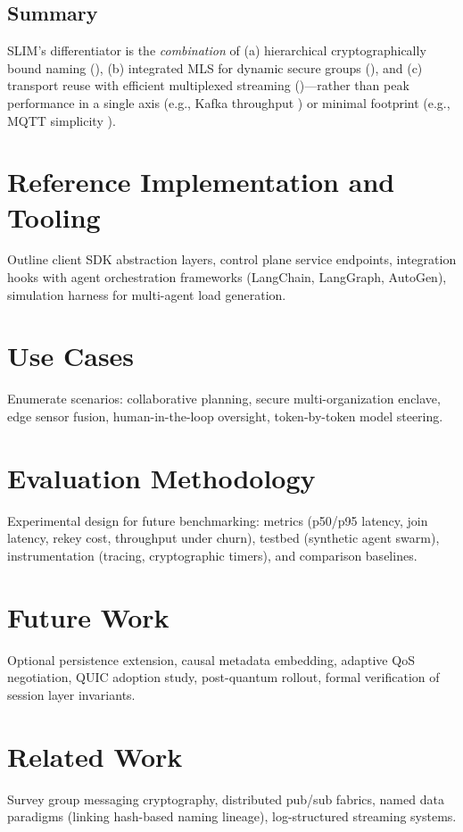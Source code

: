 \documentclass{article}
\theoremstyle{definition}
\theoremstyle{remark}
\begin{document}
\subsection{Summary}
SLIM's differentiator is the \emph{combination} of (a) hierarchical cryptographically bound naming (\citep{rfc6920,didcore}), (b) integrated MLS for dynamic secure groups (\citep{rfc9420,rfc9750}), and (c) transport reuse with efficient multiplexed streaming (\citep{grpc,http2})—rather than peak performance in a single axis (e.g., Kafka throughput \citep{kafka}) or minimal footprint (e.g., MQTT simplicity \citep{mqtt311}).

\section{Reference Implementation and Tooling}\label{sec:implementation}
Outline client SDK abstraction layers, control plane service endpoints, integration hooks with agent orchestration frameworks (LangChain, LangGraph, AutoGen), simulation harness for multi-agent load generation.

\section{Use Cases}\label{sec:usecases}
Enumerate scenarios: collaborative planning, secure multi-organization enclave, edge sensor fusion, human-in-the-loop oversight, token-by-token model steering.

\section{Evaluation Methodology}\label{sec:evaluation}
Experimental design for future benchmarking: metrics (p50/p95 latency, join latency, rekey cost, throughput under churn), testbed (synthetic agent swarm), instrumentation (tracing, cryptographic timers), and comparison baselines.

\section{Future Work}\label{sec:future}
Optional persistence extension, causal metadata embedding, adaptive QoS negotiation, QUIC adoption study, post-quantum rollout, formal verification of session layer invariants.

\section{Related Work}\label{sec:related}
Survey group messaging cryptography, distributed pub/sub fabrics, named data paradigms (linking hash-based naming lineage), log-structured streaming systems.
\end{document}
